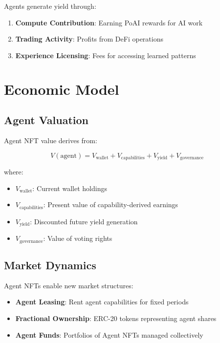\documentclass[11pt,letterpaper]{article}
\begin{document}
Agents generate yield through:
\begin{enumerate}
    \item \textbf{Compute Contribution}: Earning PoAI rewards for AI work
    \item \textbf{Trading Activity}: Profits from DeFi operations
    \item \textbf{Experience Licensing}: Fees for accessing learned patterns
\end{enumerate}

\section{Economic Model}

\subsection{Agent Valuation}

Agent NFT value derives from:

\begin{equation}
V(\text{agent}) = V_{\text{wallet}} + V_{\text{capabilities}} + V_{\text{yield}} + V_{\text{governance}}
\end{equation}

where:
\begin{itemize}
    \item $V_{\text{wallet}}$: Current wallet holdings
    \item $V_{\text{capabilities}}$: Present value of capability-derived earnings
    \item $V_{\text{yield}}$: Discounted future yield generation
    \item $V_{\text{governance}}$: Value of voting rights
\end{itemize}

\subsection{Market Dynamics}

Agent NFTs enable new market structures:
\begin{itemize}
    \item \textbf{Agent Leasing}: Rent agent capabilities for fixed periods
    \item \textbf{Fractional Ownership}: ERC-20 tokens representing agent shares
    \item \textbf{Agent Funds}: Portfolios of Agent NFTs managed collectively
\end{itemize}
\end{document}
